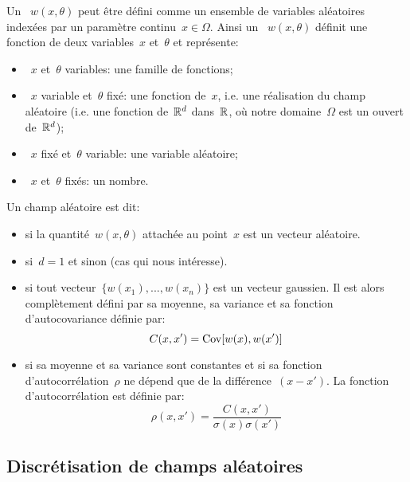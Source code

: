 \begin{definition}
Un ~$w(x,\theta)$ peut être défini comme un ensemble de variables aléatoires indexées par un paramètre continu~$x\in\Omega$.
Ainsi un ~$w(x,\theta)$ définit une fonction de deux variables~$x$ et~$\theta$ et représente:
\begin{itemize}
   \item~$x$ et~$\theta$ variables: une famille de fonctions;
   \item~$x$ variable et~$\theta$ fixé: une fonction de~$x$, i.e. une réalisation du champ aléatoire (i.e. une fonction de~$\mathbb R^d$ dans~$\mathbb R$, où notre domaine~$\Omega$ est un ouvert de~$\mathbb R^d$);
   \item~$x$ fixé et~$\theta$ variable: une variable aléatoire;
   \item~$x$ et~$\theta$ fixés: un nombre.
\end{itemize}
\end{definition}
Un champ aléatoire est dit:
\begin{itemize}
   \item {} si la quantité~$w(x,\theta)$ attachée au point~$x$ est un vecteur aléatoire.
   \item {} si~$d=1$ et  sinon (cas qui nous intéresse).
   \item {} si tout vecteur~$\{w(x_1), ..., w(x_n)\}$ est un vecteur gaussien. Il est alors complètement défini par sa moyenne, sa variance et sa fonction d'autocovariance définie par:
   \begin{equation}
       C(x,x')=\operatorname{Cov}[w(x),w(x')]
   \end{equation}
   \item {} si sa moyenne et sa variance sont constantes et si sa fonction d'autocorrélation~$\rho$ ne dépend que de la différence~$(x-x')$. La fonction d'autocorrélation est définie par:
   \begin{equation}
      \rho(x,x')=\dfrac{C(x,x')}{\sigma(x)\sigma(x')}
   \end{equation}
\end{itemize}

\medskip
\subsection{Discrétisation de champs aléatoires}

